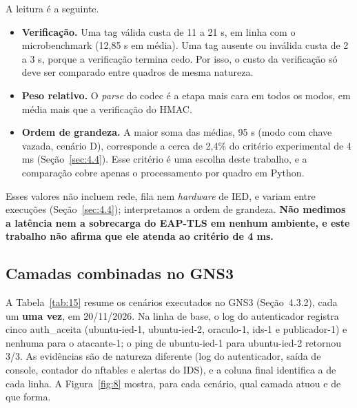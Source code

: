 \documentclass[12pt]{article}
\begin{document}
A leitura é a seguinte.

\begin{itemize}
\item \textbf{Verificação.} Uma tag válida custa de 11 a 21 \textmu{}s, em linha com o microbenchmark (12,85 \textmu{}s em média). Uma tag ausente ou inválida custa de 2 a 3 \textmu{}s, porque a verificação termina cedo. Por isso, o custo da verificação só deve ser comparado entre quadros de mesma natureza.
\item \textbf{Peso relativo.} O \emph{parse} do codec é a etapa mais cara em todos os modos, em média mais que a verificação do HMAC.
\item \textbf{Ordem de grandeza.} A maior soma das médias, 95 \textmu{}s (modo com chave vazada, cenário D), corresponde a cerca de 2,4\% do critério experimental de 4 ms (Seção~\ref{sec:4.4}). Esse critério é uma escolha deste trabalho, e a comparação cobre apenas o processamento por quadro em Python.
\end{itemize}

Esses valores não incluem rede, fila nem \emph{hardware} de IED, e variam entre execuções (Seção~\ref{sec:4.4}); interpretamos a ordem de grandeza. \textbf{Não medimos a latência nem a sobrecarga do EAP-TLS em nenhum ambiente, e este trabalho não afirma que ele atenda ao critério de 4 ms.}

\subsection{Camadas combinadas no GNS3}\label{sec:6.4}

A Tabela~\ref{tab:15} resume os cenários executados no GNS3 (Seção~4.3.2), cada um \textbf{uma vez}, em 20/11/2026. Na linha de base, o log do autenticador registra cinco auth\_\allowbreak{}aceita (ubuntu-ied-1, ubuntu-ied-2, oraculo-1, ids-1 e publicador-1) e nenhuma para o atacante-1; o ping de ubuntu-ied-1 para ubuntu-ied-2 retornou 3/3. As evidências são de natureza diferente (log do autenticador, saída de console, contador do nftables e alertas do IDS), e a coluna final identifica a de cada linha. A Figura~\ref{fig:8} mostra, para cada cenário, qual camada atuou e de que forma.
\end{document}
